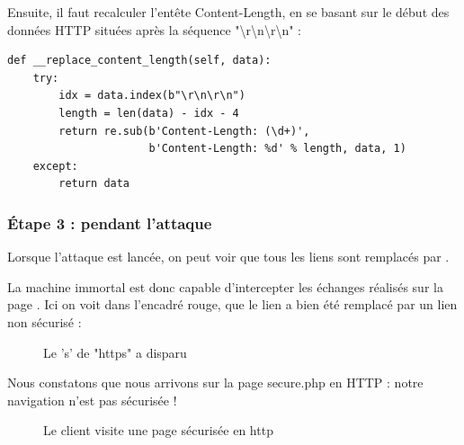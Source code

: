 Ensuite, il faut recalculer l'entête Content-Length, en se basant sur le début des données HTTP situées après la séquence "{\textbackslash}r{\textbackslash}n{\textbackslash}r{\textbackslash}n" :

\begin{verbatim}
def __replace_content_length(self, data):
    try:
        idx = data.index(b"\r\n\r\n")
        length = len(data) - idx - 4
        return re.sub(b'Content-Length: (\d+)',
                      b'Content-Length: %d' % length, data, 1)
    except:
        return data
\end{verbatim}

\subsubsection{Étape 3 : pendant l'attaque}

Lorsque l'attaque est lancée, on peut voir que tous les liens  sont remplacés par .

La machine immortal est donc capable d'intercepter les échanges réalisés sur la page . Ici on voit dans l'encadré rouge, que le lien  a bien été remplacé par un lien non sécurisé  :

\begin{figure}[H]
  \caption{Le 's' de "https" a disparu}
\end{figure}

Nous constatons que nous arrivons sur la page secure.php en HTTP : notre navigation n'est pas sécurisée !

\begin{figure}[H]
  \caption{Le client visite une page sécurisée en http}
\end{figure}

